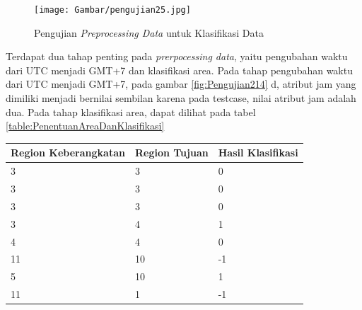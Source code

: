 \begin{enumerate}
	\begin{figure}[ht]
	\centering
	\texttt{[image: Gambar/pengujian25.jpg]}
	\caption[Pengujian \textsl{Preprocessing Data} untuk Klasifikasi Data]{Pengujian \textsl{Preprocessing Data} untuk Klasifikasi Data} 
	\label{fig:Pengujian25}
	\end{figure}

	Terdapat dua tahap penting pada \textsl{prerpocessing data}, yaitu pengubahan waktu dari UTC menjadi GMT+7 dan klasifikasi area. Pada tahap pengubahan waktu dari UTC menjadi GMT+7, pada gambar \ref{fig:Pengujian214} d, atribut jam yang dimiliki menjadi bernilai sembilan karena pada testcase, nilai atribut jam adalah dua. Pada tahap klasifikasi area, dapat dilihat pada tabel \ref{table:PenentuanAreaDanKlasifikasi}
	
	\begin{table}[ht]
	\centering
	\begin{tabular}{|l|l|l|}
	\hline
	\multicolumn{1}{|c|}{\textbf{Region Keberangkatan}} & \multicolumn{1}{c|}{\textbf{Region Tujuan}} & \multicolumn{1}{c|}{\textbf{Hasil Klasifikasi}} \\ \hline
	3                                                   & 3                                           & 0                                               \\ \hline
	3                                                   & 3                                           & 0                                               \\ \hline
	3                                                   & 3                                           & 0                                               \\ \hline
	3                                                   & 4                                           & 1                                               \\ \hline
	4                                                   & 4                                           & 0                                               \\ \hline
	11                                                  & 10                                          & -1                                              \\ \hline
	5                                                   & 10                                          & 1                                               \\ \hline
	11                                                  & 1                                           & -1                                              \\ \hline

\end{tabular}
\end{table}
\end{enumerate}
